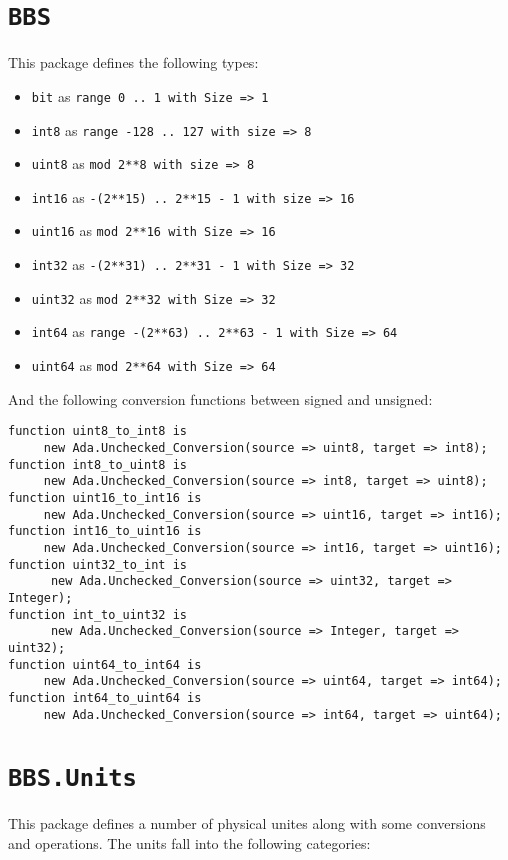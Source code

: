 \documentclass[10pt, openany]{book}
\newcommand{\package}[1]{\texttt{#1}}
\newcommand{\datatype}[1]{\texttt{#1}}
\begin{document}
\section{\package{BBS}}
This package defines the following types:
\begin{itemize}
  \item \datatype{bit} as \datatype{range 0 .. 1 with Size => 1}
  \item \datatype{int8} as \datatype{range -128 .. 127 with size => 8}
  \item \datatype{uint8} as \datatype{mod 2**8  with size => 8}
  \item \datatype{int16} as \datatype{-(2**15) .. 2**15 - 1 with size => 16}
  \item \datatype{uint16} as \datatype{mod 2**16 with Size => 16}
  \item \datatype{int32} as \datatype{-(2**31) .. 2**31 - 1 with Size => 32}
  \item \datatype{uint32} as \datatype{mod 2**32  with Size => 32}
  \item \datatype{int64} as \datatype{range -(2**63) .. 2**63 - 1  with Size => 64}
  \item \datatype{uint64} as \datatype{mod 2**64 with Size => 64}
\end{itemize}

And the following conversion functions between signed and unsigned:
\begin{lstlisting}
function uint8_to_int8 is
     new Ada.Unchecked_Conversion(source => uint8, target => int8);
function int8_to_uint8 is
     new Ada.Unchecked_Conversion(source => int8, target => uint8);
function uint16_to_int16 is
     new Ada.Unchecked_Conversion(source => uint16, target => int16);
function int16_to_uint16 is
     new Ada.Unchecked_Conversion(source => int16, target => uint16);
function uint32_to_int is
      new Ada.Unchecked_Conversion(source => uint32, target => Integer);
function int_to_uint32 is
      new Ada.Unchecked_Conversion(source => Integer, target => uint32);
function uint64_to_int64 is
     new Ada.Unchecked_Conversion(source => uint64, target => int64);
function int64_to_uint64 is
     new Ada.Unchecked_Conversion(source => int64, target => uint64);
\end{lstlisting}

\section{\package{BBS.Units}}
This package defines a number of physical unites along with some conversions and operations.  The units fall into the following categories:
\end{document}
